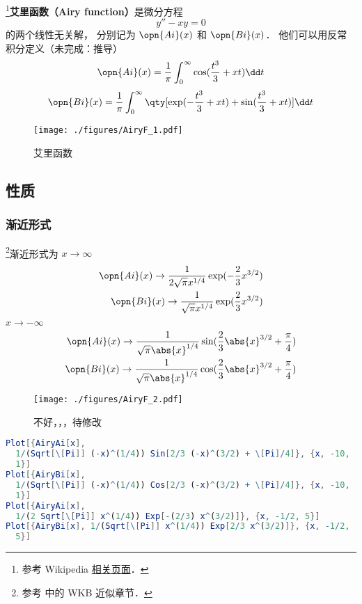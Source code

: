 
\begin{issues}
\issueDraft
\end{issues}

\footnote{参考 Wikipedia \href{https://en.wikipedia.org/wiki/Airy_function}{相关页面}．}\textbf{艾里函数（Airy function）}是微分方程
\begin{equation}
y'' - xy = 0
\end{equation}
的两个线性无关解， 分别记为 $\opn{Ai}(x)$ 和 $\opn{Bi}(x)$． 他们可以用反常积分定义（未完成：推导）
\begin{equation}
\opn{Ai}(x)=\frac 1\pi \int_0^\infty \cos(\frac{t^3}{3}+xt)\dd t
\end{equation}
\begin{equation}
\opn{Bi}(x)=\frac 1\pi \int_0^\infty \qty[\exp(-\frac{t^3}{3}+xt)+\sin(\frac{t^3}{3}+xt)]\dd t
\end{equation}

\begin{figure}[ht]
\centering
\texttt{[image: ./figures/AiryF\_1.pdf]}
\caption{艾里函数} \label{AiryF_fig1}
\end{figure}
\subsection{性质}
\subsubsection{渐近形式}
\footnote{参考 \cite{GriffQ} 中的 WKB 近似章节．}渐近形式为 $x \to \infty$
\begin{align}
\opn{Ai}(x) \to \frac{1}{2\sqrt{\pi} x^{1/4}} \exp(-\frac{2}{3}x^{3/2})\\
\opn{Bi}(x) \to \frac{1}{\sqrt{\pi} x^{1/4}} \exp(\frac{2}{3}x^{3/2})
\end{align}
$x \to -\infty$
\begin{align}
\opn{Ai}(x) \to \frac{1}{\sqrt{\pi} \abs{x}^{1/4}} \sin(\frac{2}{3}\abs{x}^{3/2}+\frac{\pi}{4})\\
\opn{Bi}(x) \to \frac{1}{\sqrt{\pi} \abs{x}^{1/4}} \cos(\frac{2}{3}\abs{x}^{3/2}+\frac{\pi}{4})
\end{align}
\begin{figure}[ht]
\centering
\texttt{[image: ./figures/AiryF\_2.pdf]}
\caption{不好，，，待修改} \label{AiryF_fig2}
\end{figure}
\begin{lstlisting}[language=Mathematica]
Plot[{AiryAi[x], 
  1/(Sqrt[\[Pi]] (-x)^(1/4)) Sin[2/3 (-x)^(3/2) + \[Pi]/4]}, {x, -10, 
  1}]
Plot[{AiryBi[x], 
  1/(Sqrt[\[Pi]] (-x)^(1/4)) Cos[2/3 (-x)^(3/2) + \[Pi]/4]}, {x, -10, 
  1}]
Plot[{AiryAi[x], 
  1/(2 Sqrt[\[Pi]] x^(1/4)) Exp[-(2/3) x^(3/2)]}, {x, -1/2, 5}]
Plot[{AiryBi[x], 1/(Sqrt[\[Pi]] x^(1/4)) Exp[2/3 x^(3/2)]}, {x, -1/2, 
  5}]
\end{lstlisting}
